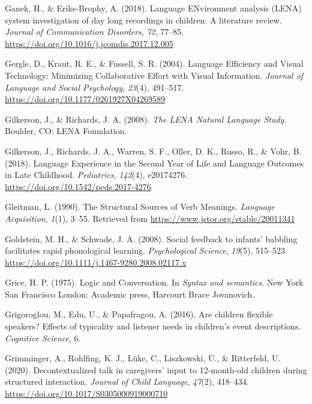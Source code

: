 \documentclass[
  man]{apa6}
\newlength{\cslhangindent}
\newlength{\cslentryspacingunit} %
\newenvironment{CSLReferences}[2] %
 {%
  \setlength{\parindent}{0pt}
  \ifodd #1
  \let\oldpar\par
  \def\par{\hangindent=\cslhangindent\oldpar}
  \fi
  \setlength{\parskip}{#2\cslentryspacingunit}
 }%
 {}
\begin{document}
\begin{CSLReferences}{1}{0}
\leavevmode{}%
Ganek, H., \& Eriks-Brophy, A. (2018). Language {ENvironment} analysis ({LENA}) system investigation of day long recordings in children: {A} literature review. \emph{Journal of Communication Disorders}, \emph{72}, 77--85. \url{https://doi.org/10.1016/j.jcomdis.2017.12.005}

\leavevmode{}%
Gergle, D., Kraut, R. E., \& Fussell, S. R. (2004). Language {Efficiency} and {Visual Technology}: {Minimizing Collaborative Effort} with {Visual Information}. \emph{Journal of Language and Social Psychology}, \emph{23}(4), 491--517. \url{https://doi.org/10.1177/0261927X04269589}

\leavevmode{}%
Gilkerson, J., \& Richards, J. A. (2008). \emph{The {LENA Natural Language Study}}. {Boulder, CO}: {LENA Foundation}.

\leavevmode{}%
Gilkerson, J., Richards, J. A., Warren, S. F., Oller, D. K., Russo, R., \& Vohr, B. (2018). Language {Experience} in the {Second Year} of {Life} and {Language Outcomes} in {Late Childhood}. \emph{Pediatrics}, \emph{142}(4), e20174276. \url{https://doi.org/10.1542/peds.2017-4276}

\leavevmode{}%
Gleitman, L. (1990). The {Structural Sources} of {Verb Meanings}. \emph{Language Acquisition}, \emph{1}(1), 3--55. Retrieved from \url{https://www.jstor.org/stable/20011341}

\leavevmode{}%
Goldstein, M. H., \& Schwade, J. A. (2008). Social feedback to infants' babbling facilitates rapid phonological learning. \emph{Psychological Science}, \emph{19}(5), 515--523. \url{https://doi.org/10.1111/j.1467-9280.2008.02117.x}

\leavevmode{}%
Grice, H. P. (1975). {Logic and Conversation}. In \emph{{Syntax and semantics}}. {New York San Francisco London}: {Academic press, Harcourt Brace Jovanovich}.

\leavevmode{}%
Grigoroglou, M., Edu, U., \& Papafragou, A. (2016). Are children flexible speakers? {Effects} of typicality and listener needs in children's event descriptions. \emph{Cognitive Science}, 6.

\leavevmode{}%
Grimminger, A., Rohlfing, K. J., Lüke, C., Liszkowski, U., \& Ritterfeld, U. (2020). Decontextualized talk in caregivers' input to 12-month-old children during structured interaction. \emph{Journal of Child Language}, \emph{47}(2), 418--434. \url{https://doi.org/10.1017/S0305000919000710}


\end{CSLReferences}
\end{document}
